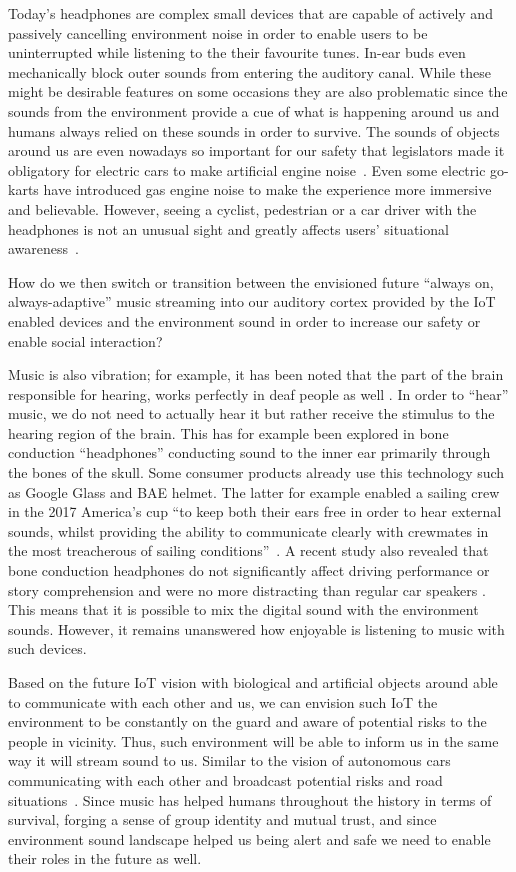 \documentclass[manuscript,screen]{acmart}
\begin{document}
Today's headphones are complex small devices that are capable of actively and passively cancelling environment noise in order to enable users to be uninterrupted while listening to the their favourite tunes. In-ear buds even mechanically block outer sounds from entering the auditory canal. While these might be desirable features on some occasions they are also problematic since the sounds from the environment provide a cue of what is happening around us and humans always relied on these sounds in order to survive. The sounds of objects around us are even nowadays so important for our safety that legislators made it obligatory for electric cars to make artificial engine noise~\cite{guy2019carnoise}. Even some electric go-karts have introduced gas engine noise to make the experience more immersive and believable. However, seeing a cyclist, pedestrian or a car driver with the headphones is not an unusual sight and greatly affects users' situational awareness~\cite{roads2018headphonedriving}. 

How do we then switch or transition between the envisioned future ``always on, always-adaptive'' music streaming into our auditory cortex provided by the IoT enabled devices and the environment sound in order to increase our safety or enable social interaction? 

Music is also vibration; for example, it has been noted that the part of the brain responsible for hearing, works perfectly in deaf people as well \cite{abcsciencemusic}. In order to ``hear'' music, we do not need to actually hear it but rather receive the stimulus to the hearing region of the brain. This has for example been explored in bone conduction ``headphones'' conducting sound to the inner ear primarily through the bones of the skull. Some consumer products already use this technology such as Google Glass and BAE helmet. The latter for example enabled a sailing crew in the 2017 America's cup ``to keep both their ears free in order to hear external sounds, whilst providing the ability to communicate clearly with crewmates in the most treacherous of sailing conditions''~\cite{bae2019boneconhelmet}. A recent study also revealed that bone conduction headphones do not significantly affect driving performance or story comprehension and were no more distracting than regular car speakers \cite{granados2018usability}. This means that it is possible to mix the digital sound with the environment sounds. However, it remains unanswered how enjoyable is listening to music with such devices. 

Based on the future IoT vision with biological and artificial objects around able to communicate with each other and us, we can envision such IoT the environment to be constantly on the guard and aware of potential risks to the people in vicinity. Thus, such environment will be able to inform us in the same way it will stream sound to us. Similar to the vision of autonomous cars communicating with each other and broadcast potential risks and road situations~\cite{shankland20195gcars}. Since music has helped humans throughout the history in terms of survival, forging a sense of group identity and mutual trust, and since environment sound landscape helped us being alert and safe we need to enable their roles in the future as well. 
\end{document}
